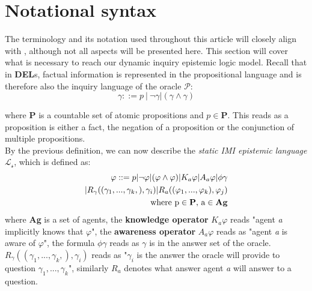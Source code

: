 \section{Notational syntax}
The terminology and its notation used throughout this article will closely
align with \cite{delimi}, although not all aspects will be presented here. This
section will cover what is necessary to reach our dynamic inquiry epistemic
logic model. Recall that in \textbf{DEL}s, factual information is represented
in the propositional language and is therefore also the inquiry language of the
oracle $\mathscr{P}$: $$ \gamma::= p\:|\:\neg\gamma|(\gamma\land\gamma) $$

where \textbf{P} is a countable set of atomic propositions and $p \in
	\mathbf{P}$. This reads as a proposition is either a fact, the negation of a
proposition or the conjunction of multiple propositions.\\ By the previous
definition, we can now describe the \textit{static IMI epistemic language}
$\mathscr{L_s}$, which is defined as:
\begin{align*}
	\varphi ::= p |\neg\varphi|(\varphi \land \varphi) | K_a\varphi | A_a\varphi | \phi\gamma \\| R_\gamma((\gamma_1,...,\gamma_k,), \gamma_i) | R_a((\varphi_1,...,\varphi_k), \varphi_j) \\ \text{where p} \in \text{\textbf{P}}\text{, a} \in \text{\textbf{Ag}}
\end{align*}
where \textbf{Ag} is a set of agents, the \textbf{knowledge operator} $K_a\varphi$ reads "agent \textit{a} implicitly knows that $\varphi$", the \textbf{awareness operator} $A_a\varphi$ reads as "agent \textit{a} is aware of $\varphi$", the formula $\phi\gamma$ reads as $\gamma$ is in the answer set of the oracle. $R_\gamma((\gamma_1,...,\gamma_k,), \gamma_i)$ reads as "$\gamma_i$ is the answer the oracle will provide to question $\gamma_1,...,\gamma_k$", similarly $R_a$ denotes what answer agent \textit{a} will answer to a question.

